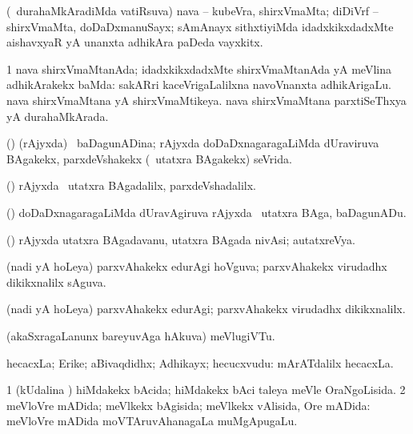 {{\bentry
{} 
\gl{\nA}
\expl{}
\bmng
(\kanmu\ durahaMkAradiMda vatiRsuva) nava -- kubeVra, shirxVmaMta; diDiVrf -- shirxVmaMta, doDaDxmanuSayx; sAmAnayx sithxtiyiMda idadxkikxdadxMte aishavxyaR yA unanxta adhikAra paDeda vayxkitx. 
\emng
\eentry

\bentry
{} 
\gl{\gu}
\expl{}
\bmng
\bnum
\num{1} nava shirxVmaMtanAda; idadxkikxdadxMte shirxVmaMtanAda yA meVlina adhikArakekx baMda:  sakARri kaceVrigaLalilxna navoVnanxta adhikArigaLu. 
\banum
{} nava shirxVmaMtana yA shirxVmaMtikeya. 
 nava shirxVmaMtana parxtiSeThxya yA durahaMkArada. 
\eanum
\numie
\enum
\emng
\eentry

\bentry
{} 
\gl{\gu}
\expl{}
\bmng
(\ame) (rAjyxda) \kanmu\ baDagunADina; rAjyxda doDaDxnagaragaLiMda dUraviruva BAgakekx, parxdeVshakekx (\kanmu\ utatxra BAgakekx) seVrida. 
\emng
\eentry

\bentry
{} 
\gl{\kirxvi}
\expl{}
\bmng
(\ame) rAjyxda \kanmu\ utatxra BAgadalilx, parxdeVshadalilx. 
\emng
\eentry

\bentry
{} 
\gl{\nA}
\expl{}
\bmng
(\ame) doDaDxnagaragaLiMda dUravAgiruva rAjyxda \kanmu\ utatxra BAga, baDagunADu. 
\emng
\eentry

\bentry
{} 
\gl{\nA}
\expl{}
\bmng
(\ame) rAjyxda utatxra BAgadavanu, utatxra BAgada nivAsi; autatxreVya. 
\emng
\eentry

\bentry
{} 
\gl{\gu}
\expl{}
\bmng
(nadi yA hoLeya) parxvAhakekx edurAgi hoVguva; parxvAhakekx virudadhx dikikxnalilx sAguva. 
\emng
\eentry

\bentry
{} 
\gl{\kirxvi}
\expl{}
\bmng
(nadi yA hoLeya) parxvAhakekx edurAgi; parxvAhakekx virudadhx dikikxnalilx. 
\emng
\eentry

\bentry
{} 
\gl{\nA}
\expl{}
\bmng
(akaSxragaLanunx bareyuvAga hAkuva) meVlugiVTu. 
\emng
\eentry

\bentry
{} 
\gl{\nA}
\expl{}
\bmng
hecacxLa; Erike; aBivaqdidhx; Adhikayx; hecucxvudu:  mArATdalilx hecacxLa. 
\emng
\eentry

\bentry
{} 
\gl{\gu}
\bmng
\bnum
\num{1} (kUdalina \vi) hiMdakekx bAcida; hiMdakekx bAci taleya meVle OraNgoLisida.
\num{2} meVloVre mADida; meVlkekx bAgisida; meVlkekx vAlisida, Ore mADida:  meVloVre mADida moVTAruvAhanagaLa muMgApugaLu. 
\enum
\emng
\eentry

}}
